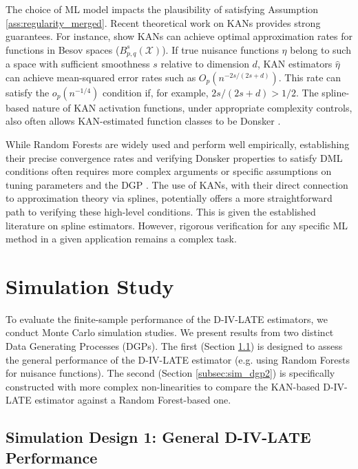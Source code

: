 \documentclass[final,3p,fleqn, 10pt]{elsarticle}
\begin{document}
The choice of ML model impacts the plausibility of satisfying Assumption \ref{ass:regularity_merged}. Recent theoretical work on KANs provides strong guarantees. For instance, \citet{kratsios2025kolmogorov} show KANs can achieve optimal approximation rates for functions in Besov spaces ($B^{s}_{p,q}(\mathcal{X})$). If true nuisance functions $\eta$ belong to such a space with sufficient smoothness $s$ relative to dimension $d$, KAN estimators $\hat{\eta}$ can achieve mean-squared error rates such as $O_p(n^{-2s/(2s+d)})$. This rate can satisfy the $o_p(n^{-1/4})$ condition if, for example, $2s/(2s+d) > 1/2$. The spline-based nature of KAN activation functions, under appropriate complexity controls, also often allows KAN-estimated function classes to be Donsker \citep[e.g.][]{newey1997convergence}.

While Random Forests are widely used and perform well empirically, establishing their precise convergence rates and verifying Donsker properties to satisfy DML conditions often requires more complex arguments or specific assumptions on tuning parameters and the DGP \citep{wager2015adaptive, athey2019generalized, peng2022rates}. The use of KANs, with their direct connection to approximation theory via splines, potentially offers a more straightforward path to verifying these high-level conditions. This is given the established literature on spline estimators. However, rigorous verification for any specific ML method in a given application remains a complex task.

\section{Simulation Study}
\label{sec:simulations}

To evaluate the finite-sample performance of the D-IV-LATE estimators, we conduct Monte Carlo simulation studies. We present results from two distinct Data Generating Processes (DGPs). The first (Section \ref{subsec:sim_dgp1}) is designed to assess the general performance of the D-IV-LATE estimator (e.g. using Random Forests for nuisance functions). The second (Section \ref{subsec:sim_dgp2}) is specifically constructed with more complex non-linearities to compare the KAN-based D-IV-LATE estimator against a Random Forest-based one.

\subsection{Simulation Design 1: General D-IV-LATE Performance}
\label{subsec:sim_dgp1}
\end{document}
